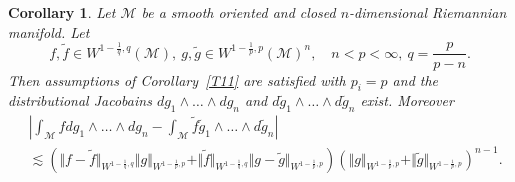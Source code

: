 \documentclass[intlimits,12pt,reqno]{amsart}
\newcommand{\cM}{\mathcal M}
\numberwithin{equation}{section}
\newtheorem{corollary}[theorem]{Corollary}
\theoremstyle{definition}
\begin{document}
\begin{corollary}
\label{T13}
Let $\cM$ be a smooth oriented and closed $n$-dimensional Riemannian manifold. Let
$$
f,\tilde{f}\in W^{1-\frac{1}{q},q}(\cM),\ g,\tilde{g}\in W^{1-\frac{1}{p},p}(\cM)^n,
\quad
n<p<\infty,\ q=\frac{p}{p-n}.
$$
Then assumptions of Corollary~\ref{T11} are satisfied with $p_i=p$ and the distributional Jacobains 
$dg_1\wedge\ldots\wedge dg_n$ and $d\tilde{g}_1\wedge\ldots\wedge d\tilde{g}_n$ exist. Moreover 
\begin{align*}
&\left|\int_{\cM} fdg_1\wedge\ldots\wedge dg_n-\int_{\cM}\tilde{f}\tilde{g}_1\wedge\ldots\wedge d\tilde{g}_n\right|\\
&\lesssim
\left(\Vert f-\tilde{f}\Vert_{W^{1-\frac{1}{q},q}}\Vert g\Vert_{W^{1-\frac{1}{p},p}}
+\Vert\tilde{f}\Vert_{W^{1-\frac{1}{q},q}}\Vert g-\tilde{g}\Vert_{W^{1-\frac{1}{p},p}}\right)
\left(\Vert g\Vert_{W^{1-\frac{1}{p},p}}+\Vert \tilde{g}\Vert_{W^{1-\frac{1}{p},p}}\right)^{n-1}.
\end{align*}
\end{corollary}
\end{document}
